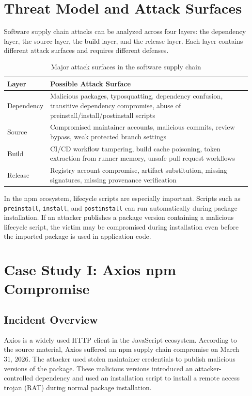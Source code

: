 \documentclass[12pt,a4paper]{article}
\begin{document}
\section{Threat Model and Attack Surfaces}

Software supply chain attacks can be analyzed across four layers: the dependency layer, the source layer, the build layer, and the release layer. Each layer contains different attack surfaces and requires different defenses.

\begin{table}[h]
\centering
\caption{Major attack surfaces in the software supply chain}
\begin{tabularx}{\textwidth}{P{3cm}Y}
\toprule
\textbf{Layer} & \textbf{Possible Attack Surface} \\
\midrule
Dependency & Malicious packages, typosquatting, dependency confusion, transitive dependency compromise, abuse of preinstall/install/postinstall scripts \\
Source & Compromised maintainer accounts, malicious commits, review bypass, weak protected branch settings \\
Build & CI/CD workflow tampering, build cache poisoning, token extraction from runner memory, unsafe pull request workflows \\
Release & Registry account compromise, artifact substitution, missing signatures, missing provenance verification \\
\bottomrule
\end{tabularx}
\end{table}

In the npm ecosystem, lifecycle scripts are especially important. Scripts such as \texttt{preinstall}, \texttt{install}, and \texttt{postinstall} can run automatically during package installation. If an attacker publishes a package version containing a malicious lifecycle script, the victim may be compromised during installation even before the imported package is used in application code.

\section{Case Study I: Axios npm Compromise}

\subsection{Incident Overview}

Axios is a widely used HTTP client in the JavaScript ecosystem. According to the source material, Axios suffered an npm supply chain compromise on March 31, 2026. The attacker used stolen maintainer credentials to publish malicious versions of the package. These malicious versions introduced an attacker-controlled dependency and used an installation script to install a remote access trojan (RAT) during normal package installation.
\end{document}
